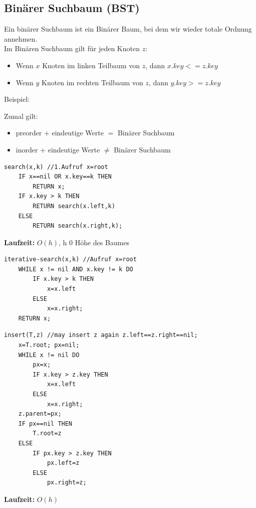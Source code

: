 \documentclass{article}
\begin{document}
        \subsection{Binärer Suchbaum (BST)}
            Ein binärer Suchbaum ist ein Binärer Baum, bei dem wir wieder totale Ordnung annehmen. \\
            Im Binären Suchbaum gilt für jeden Knoten $z$: 
            \begin{itemize}
                \item Wenn $x$ Knoten im linken Teilbaum von $z$, dann $x.key <= z.key$
                \item Wenn $y$ Knoten im rechten Teilbaum von $z$, dann $y.key >= z.key$
            \end{itemize}
            Beispiel:
            \begin{center}
              \end{center}
            Zumal gilt: 
            \begin{itemize}
                \item preorder + eindeutige Werte $=$ Binärer Suchbaum
                \item inorder + eindeutige Werte $\neq$ Binärer Suchbaum
            \end{itemize}
            \begin{lstlisting}[style=pseudocode]
search(x,k) //1.Aufruf x=root
    IF x==nil OR x.key==k THEN
        RETURN x;
    IF x.key > k THEN
        RETURN search(x.left,k)
    ELSE
        RETURN search(x.right,k);
            \end{lstlisting}
            \textbf{Laufzeit:} $O(h)$, h 0 Höhe des Baumes
            \begin{lstlisting}[style=pseudocode]
iterative-search(x,k) //Aufruf x=root
    WHILE x != nil AND x.key != k DO
        IF x.key > k THEN
            x=x.left
        ELSE
            x=x.right;
    RETURN x;
            \end{lstlisting}
            \begin{lstlisting}[style=pseudocode]
insert(T,z) //may insert z again z.left==z.right==nil;
    x=T.root; px=nil;
    WHILE x != nil DO
        px=x;
        IF x.key > z.key THEN
            x=x.left
        ELSE
            x=x.right;
    z.parent=px;
    IF px==nil THEN
        T.root=z
    ELSE
        IF px.key > z.key THEN
            px.left=z
        ELSE
            px.right=z;
            \end{lstlisting}
            \textbf{Laufzeit:} $O(h)$
\end{document}
